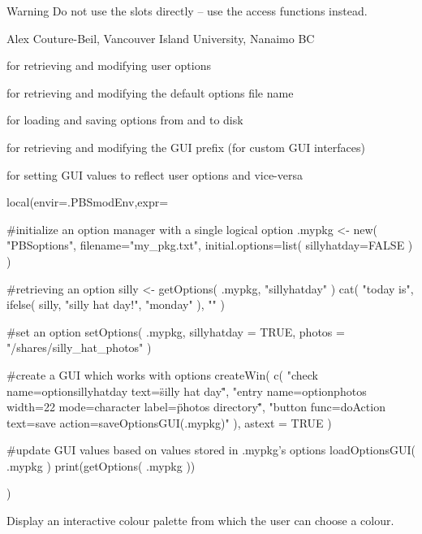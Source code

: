\documentclass[letterpaper]{book}
\begin{document}
%
\begin{Section}{Warning }
Do not use the slots directly -- use the access functions instead.
\end{Section}
%
\begin{Author}\relax
 Alex Couture-Beil, Vancouver Island University, Nanaimo BC 
\end{Author}
%
\begin{SeeAlso}\relax
{} for retrieving and modifying user options

 for retrieving and modifying the default options file name

 for loading and saving options from and to disk

 for retrieving and modifying the GUI prefix (for custom GUI interfaces)

 for setting GUI values to reflect user options and vice-versa
\end{SeeAlso}
%
\begin{Examples}
\begin{ExampleCode}
local(envir=.PBSmodEnv,expr={
  #initialize an option manager with a single logical option
  .mypkg <- new( "PBSoptions", filename="my_pkg.txt", 
    initial.options=list( sillyhatday=FALSE ) )

  #retrieving an option
  silly <- getOptions( .mypkg, "sillyhatday" )
  cat( "today is", ifelse( silly, "silly hat day!", "monday" ), "\n" )

  #set an option
  setOptions( .mypkg, sillyhatday = TRUE, photos = "/shares/silly_hat_photos" )

  #create a GUI which works with options
  createWin( c( 
    "check name=optionsillyhatday text=\"silly hat day\"",
    "entry name=optionphotos width=22 mode=character label=\"photos directory\"",
    "button func=doAction text=save action=saveOptionsGUI(.mypkg)" ), astext = TRUE )

  #update GUI values based on values stored in .mypkg's options
  loadOptionsGUI( .mypkg )
  print(getOptions( .mypkg ))
})
\end{ExampleCode}
\end{Examples}
%
\begin{Description}\relax
Display an interactive colour palette from which the user can choose a colour. 
\end{Description}
\end{document}
